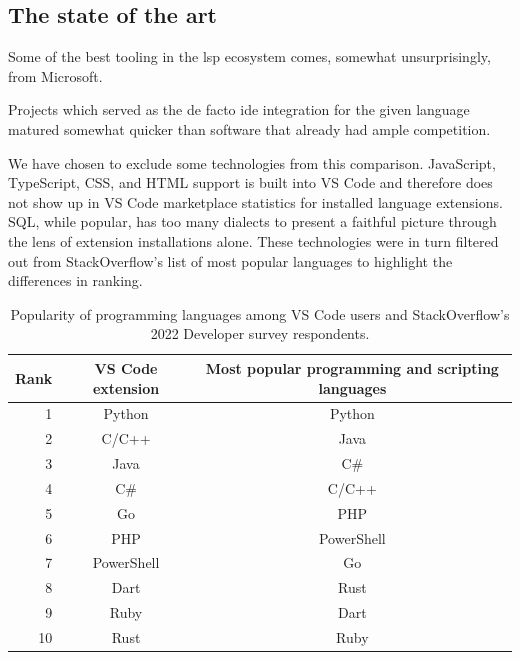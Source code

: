 \subsection{The state of the art}

Some of the best tooling in the \acrshort{lsp} ecosystem comes, somewhat
unsurprisingly, from Microsoft.

Projects which served as the de facto \acrshort{ide} integration for the given
language matured somewhat quicker than software that already had ample
competition.


We have chosen to exclude some technologies from this comparison. JavaScript,
TypeScript, CSS, and HTML support is built into VS Code and therefore does not
show up in VS Code marketplace statistics for installed language extensions.
SQL, while popular, has too many dialects to present a faithful picture through
the lens of extension installations alone. These technologies were in turn
filtered out from StackOverflow's list of most popular languages to highlight
the differences in ranking.


\begin{table}\centering
\caption{Popularity of programming languages among VS Code users and
StackOverflow's 2022 Developer survey\cite{stackoverflow-survey-2022}
respondents.}
\begin{tabular}{|r|c|c|}
	Rank & VS Code extension & Most popular programming and scripting languages
	\tabularnewline \hline
	1  & Python     & Python     \tabularnewline
	2  & C/C++      & Java       \tabularnewline
	3  & Java       & C\#        \tabularnewline
	4  & C\#        & C/C++      \tabularnewline
	5  & Go         & PHP        \tabularnewline
	6  & PHP        & PowerShell \tabularnewline
	7  & PowerShell & Go         \tabularnewline
	8  & Dart       & Rust       \tabularnewline
	9  & Ruby       & Dart       \tabularnewline
	10 & Rust       & Ruby       \tabularnewline
\end{tabular}
\end{table}


